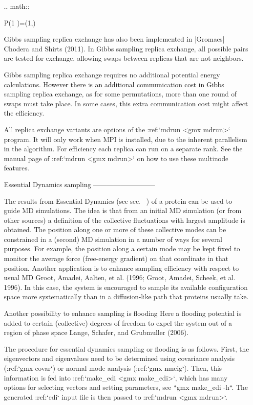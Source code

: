 {.. math::

   P(1 )=\min\left(1,\exp{} \right)

Gibbs sampling replica exchange has also been implemented in
|Gromacs| Chodera and Shirts (2011). In Gibbs sampling replica exchange,
all possible pairs are tested for exchange, allowing swaps between
replicas that are not neighbors.

Gibbs sampling replica exchange requires no additional potential energy
calculations. However there is an additional communication cost in Gibbs
sampling replica exchange, as for some permutations, more than one round
of swaps must take place. In some cases, this extra communication cost
might affect the efficiency.

All replica exchange variants are options of the :ref:`mdrun <gmx mdrun>`
program. It will only work when MPI is installed, due to the inherent
parallelism in the algorithm. For efficiency each replica can run on a
separate rank. See the manual page of :ref:`mdrun <gmx mdrun>` on how to
use these multinode features.

Essential Dynamics sampling
---------------------------

The results from Essential Dynamics (see
sec. 
) of a protein can be used to guide
MD simulations. The idea is that from an initial MD simulation (or from
other sources) a definition of the collective fluctuations with largest
amplitude is obtained. The position along one or more of these
collective modes can be constrained in a (second) MD simulation in a
number of ways for several purposes. For example, the position along a
certain mode may be kept fixed to monitor the average force (free-energy
gradient) on that coordinate in that position. Another application is to
enhance sampling efficiency with respect to usual MD Groot, Amadei,
Aalten, et al. (1996; Groot, Amadei, Scheek, et al. 1996). In this case,
the system is encouraged to sample its available configuration space
more systematically than in a diffusion-like path that proteins usually
take.

Another possibility to enhance sampling is
flooding
Here a flooding potential is
added to certain (collective) degrees of freedom to expel the system out
of a region of phase space Lange, Schafer, and Grubmuller (2006).

The procedure for essential dynamics sampling or flooding is as follows.
First, the eigenvectors and eigenvalues need to be determined using
covariance analysis (:ref:`gmx covar`) or normal-mode analysis
(:ref:`gmx nmeig`). Then, this information is fed into
:ref:`make_edi <gmx make_edi>`, which has many options for selecting vectors
and setting parameters, see ``gmx make_edi -h``. The
generated :ref:`edi` input file is then passed to
:ref:`mdrun <gmx mdrun>`.

}
